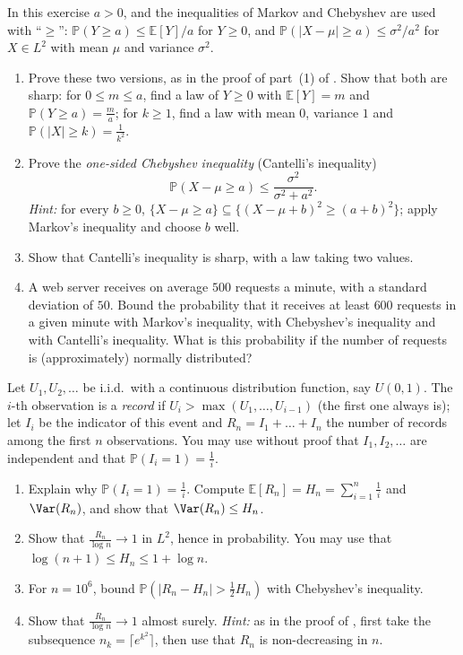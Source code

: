 \begin{exercise}\label{ex:ll-cantelli}
\hard In this exercise $a>0$, and the inequalities of Markov and Chebyshev are used with
``$\ge$'': $\mathbb P(Y\ge a)\le\mathbb E[Y]/a$ for $Y\ge0$, and
$\mathbb P(|X-\mu|\ge a)\le\sigma^2/a^2$ for $X\in L^2$ with mean $\mu$ and variance $\sigma^2$.
\begin{enumerate}[label=(\alph*)]
  \item Prove these two versions, as in the proof of part~(1) of .
    Show that both are sharp: for $0\le m\le a$, find a law of $Y\ge0$ with $\mathbb E[Y]=m$ and
    $\mathbb P(Y\ge a)=\frac ma$; for $k\ge1$, find a law with mean $0$, variance $1$ and
    $\mathbb P(|X|\ge k)=\frac1{k^2}$.
  \item Prove the \emph{one-sided Chebyshev inequality} (Cantelli's inequality)
    \[
      \mathbb P(X-\mu\ge a)\le\frac{\sigma^2}{\sigma^2+a^2}.
    \]
    \emph{Hint:} for every $b\ge0$, $\{X-\mu\ge a\}\subseteq\{(X-\mu+b)^2\ge(a+b)^2\}$; apply
    Markov's inequality and choose $b$ well.
  \item Show that Cantelli's inequality is sharp, with a law taking two values.
  \item A web server receives on average $500$ requests a minute, with a standard deviation of
    $50$. Bound the probability that it receives at least $600$ requests in a given minute with
    Markov's inequality, with Chebyshev's inequality and with Cantelli's inequality. What is this
    probability if the number of requests is (approximately) normally distributed?
\end{enumerate}
\end{exercise}

\begin{exercise}\label{ex:ll-records}
\medium Let $U_1,U_2,\dots$ be i.i.d.\ with a continuous distribution function, say $U(0,1)$. The
$i$-th observation is a \emph{record} if $U_i>\max(U_1,\dots,U_{i-1})$ (the first one always is);
let $I_i$ be the indicator of this event and $R_n=I_1+\dots+I_n$ the number of records among the
first $n$ observations. You may use without proof that $I_1,I_2,\dots$ are independent and that
$\mathbb P(I_i=1)=\frac1i$.
\begin{enumerate}[label=(\alph*)]
  \item Explain why $\mathbb P(I_i=1)=\frac1i$. Compute $\mathbb E[R_n]=H_n=\sum_{i=1}^n\frac1i$ and
    $\Var(R_n)$, and show that $\Var(R_n)\le H_n$.
  \item Show that $\frac{R_n}{\log n}\to1$ in $L^2$, hence in probability. You may use that
    $\log(n+1)\le H_n\le1+\log n$.
  \item For $n=10^6$, bound $\mathbb P(|R_n-H_n|>\frac12H_n)$ with Chebyshev's inequality.
  \item Show that $\frac{R_n}{\log n}\to1$ almost surely. \emph{Hint:} as in the proof of
    , first take the subsequence $n_k=\lceil e^{k^2}\rceil$, then
    use that $R_n$ is non-decreasing in $n$.
\end{enumerate}
\end{exercise}

